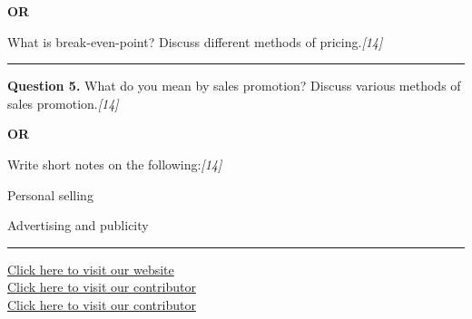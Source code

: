 \documentclass[11pt,a4paper]{article}
\newcommand{\pts}[1]{\hfill   \textit{[#1]}}
\begin{document}
\centerline{   \textbf{OR}}

What is break-even-point? Discuss different methods of pricing.\pts{14}

\medskip\rule{\linewidth}{0.2pt}




\noindent   \textbf{Question 5.}
What do you mean by sales promotion? Discuss various methods of sales promotion.\pts{14}

\centerline{   \textbf{OR}}

Write short notes on the following:\pts{14}

\begin{parts}
  \item Personal selling
  \item Advertising and publicity
\end{parts}

\vfill
\rule{\linewidth}{0.4pt}

\begin{center}\small
\href{https://bhu-exam.vercel.app/}{Click here to visit our website}\\[4pt]
\href{https://me-aryan.vercel.app/}{Click here to visit our contributor}\\[4pt]
\href{https://quashan-me.vercel.app/}{Click here to visit our contributor}
\end{center}
\end{document}
